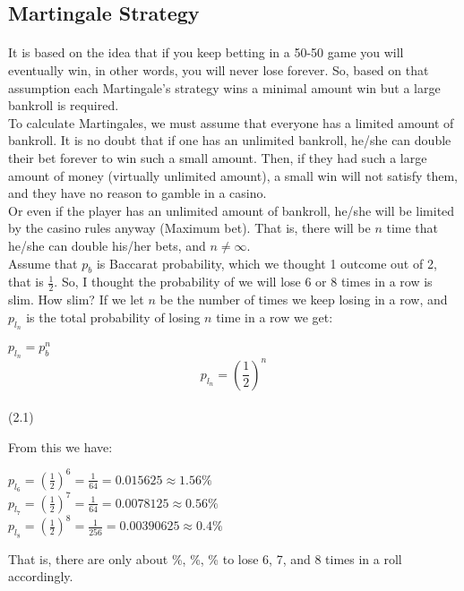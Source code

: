 \documentclass{article}
\begin{document}
\subsection{Martingale Strategy}
\paragraph{ }
	It is based on the idea that if you keep betting in a 50-50 game you will eventually win, in other words, you will never lose forever.  So, based on that assumption each Martingale's strategy wins a minimal amount win but a large bankroll is required.\\
	
To calculate Martingales, we must assume that everyone has a limited amount of bankroll.  It is no doubt that if one has an unlimited bankroll, he/she can double their bet forever to win such a small amount.  Then, if they had such a large amount of money (virtually unlimited amount), a small win will not satisfy them, and they have no reason to gamble in a casino.\\

Or even if the player has an unlimited amount of bankroll, he/she will be limited by the casino rules anyway  (Maximum bet).  That is, there will be $n$ time that he/she can double his/her bets, and $n\neq\infty$.\\

	Assume that $p_b$ is Baccarat probability, which we thought 1 outcome out of 2, that is $\frac{1}{2}$.  So, I thought the probability of we will lose 6 or 8 times in a row is slim. How slim? If we let $n$ be the number of times we keep losing in a row, and $p_{l_n}$ is the total probability of losing $n$ time in a row we get:\par
\begin{center}
$p_{l_n}=p_b^n$
$$p_{l_n}=(\frac{1}{2})^n$$\\(2.1)
\end{center}
  From this we have:\\
\begin{center}
$p_{l_6}=(\frac{1}{2})^6=\frac{1}{64}=0.015625\approx1.56\%$\\
$p_{l_7}=(\frac{1}{2})^7=\frac{1}{64}=0.0078125\approx0.56\%$\\
$p_{l_8}=(\frac{1}{2})^8=\frac{1}{256}=0.00390625\approx0.4\%$\\ 
\end{center}
That is, there are only about \%, \%, \% to lose 6, 7, and 8 times in a roll accordingly.  \\
\end{document}

